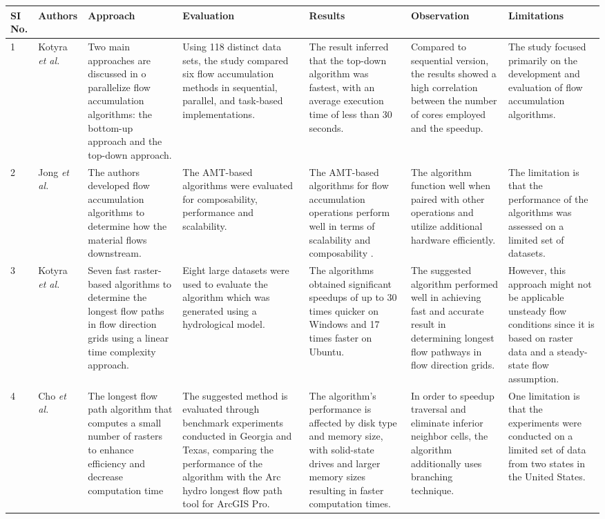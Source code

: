 \documentclass[journal, a4paper]{IEEEtran}
\begin{document}
\begin{table}[]
\begin{tabular}{ | p{0.7cm} | p{1cm} | p{2.5cm} | p{2.5cm} | p{2.5cm} |  p{2.5cm} |p{2.5cm} | }
			\hline
			\textbf{SI No.} &  \textbf{Authors} & \textbf{Approach} & \textbf{Evaluation} & \textbf{Results} & \textbf{Observation} & \textbf{Limitations}\\
			\hline
			1     &  Kotyra \textit{et al.} \cite{KOTYRA2021104741}& Two main approaches are discussed in o parallelize flow accumulation algorithms: the bottom-up approach and the top-down approach.  &  Using 118 distinct data sets, the study compared six flow accumulation methods in sequential, parallel, and task-based implementations. &	 The result inferred that the top-down algorithm was fastest, with an average execution time of less than 30 seconds. & Compared to sequential version, the results showed a high correlation between the number of cores employed and the speedup. & The study focused primarily on the development and evaluation of flow accumulation algorithms. \\
			\hline
			2     &  Jong \textit{et al.} \cite{DEJONG2022105083} & The authors  developed flow accumulation algorithms to determine how the material flows downstream.&  The AMT-based algorithms were evaluated for composability, performance and scalability. & The AMT-based algorithms for flow accumulation operations perform well in terms of scalability and composability .  & The algorithm function well when paired with other operations and utilize additional hardware efficiently. & The limitation is that the performance of the algorithms was assessed on a limited set of datasets.\\
			\hline
			3     &  Kotyra \textit{et al.} \cite{KOTYRA2023105728} & Seven fast raster-based algorithms to determine the longest flow paths in flow direction grids using a linear time complexity approach. & Eight large datasets were used to evaluate the algorithm which was generated using a hydrological model.& The algorithms obtained significant speedups of up to 30 times quicker on Windows and 17 times faster on Ubuntu. & The suggested algorithm performed well in achieving fast and accurate result in determining longest flow pathways in flow direction grids.& However, this approach might not be applicable unsteady flow conditions since it is based on raster data and a steady-state flow assumption.\\
			\hline
			4      & Cho \textit{et al.} \cite{CHO2020104774} & The longest flow path algorithm that computes a small number of rasters to enhance efficiency and decrease computation time  & The suggested method is evaluated through benchmark experiments conducted in Georgia and Texas, comparing the performance of the algorithm with the Arc hydro longest flow path tool for ArcGIS Pro.& The algorithm's performance is affected by disk type and memory size, with solid-state drives and larger memory sizes resulting in faster computation times.  & In order to speedup traversal and eliminate inferior neighbor cells, the algorithm additionally uses branching technique. &  One limitation is that the experiments were conducted on a limited set of data from two states in the United States.\\
			\hline
		

\end{tabular}
\end{table}
\end{document}
